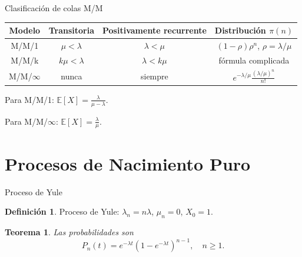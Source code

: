 \documentclass[aspectratio=169]{beamer}
\theoremstyle{plain}
\newtheorem{teorema}{Teorema}
\theoremstyle{definition}
\newtheorem{definicion}{Definición}
\newcommand{\E}{\mathbb{E}}
\newcommand{\1}{\mathbf{1}}
\begin{document}
\begin{frame}{Clasificación de colas M/M}
  \begin{center}
    \begin{tabular}{|c|c|c|c|}
      \hline
      Modelo & Transitoria & Positivamente recurrente & Distribución $\pi(n)$ \\
      \hline
      M/M/1 & $\mu < \lambda$ & $\lambda < \mu$ & $(1-\rho)\rho^n$, $\rho=\lambda/\mu$ \\
      \hline
      M/M/k & $k\mu < \lambda$ & $\lambda < k\mu$ & fórmula complicada \\
      \hline
      M/M/$\infty$ & nunca & siempre & $e^{-\lambda/\mu}\frac{(\lambda/\mu)^n}{n!}$ \\
      \hline
    \end{tabular}
  \end{center}
  
  \vspace{0.5cm}
  Para M/M/1: $\displaystyle \E[X] = \frac{\lambda}{\mu-\lambda}$.
  
  Para M/M/$\infty$: $\E[X] = \frac{\lambda}{\mu}$.
\end{frame}

\section{Procesos de Nacimiento Puro}

\begin{frame}{Proceso de Yule}
  \begin{definicion}
    Proceso de Yule: $\lambda_n = n\lambda$, $\mu_n = 0$, $X_0 = 1$.
  \end{definicion}
  
  \begin{teorema}
    Las probabilidades son
    \[ P_n(t) = e^{-\lambda t}(1 - e^{-\lambda t})^{n-1}, \quad n \ge 1. \]
  \end{teorema}
  
  \begin{center}
  \end{center}
\end{frame}
\end{document}

